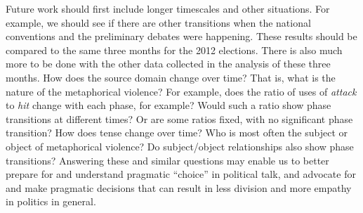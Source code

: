Future work should first include longer timescales and other situations. For
example, we should see if there are other transitions when the national 
conventions and the preliminary debates were happening. These results 
should be compared to the same three months for the 2012 elections. There is
also much more to be done with the other data collected in the analysis of 
these three months. How does the source domain change over time? That is, 
what is the nature of the metaphorical violence? For example, does
the ratio of uses of \textit{attack} to \textit{hit} change
with each phase, for example? Would such a ratio show phase transitions
at different times? Or are some ratios fixed, with no significant phase
transition? How does tense change over time? Who is most often the subject
or object of metaphorical violence? Do subject/object relationships also
show phase transitions? Answering these and similar questions may enable us
to better prepare for and understand pragmatic ``choice'' in political talk, 
and advocate for and make pragmatic decisions that can result in less division
and more empathy in politics in general.
